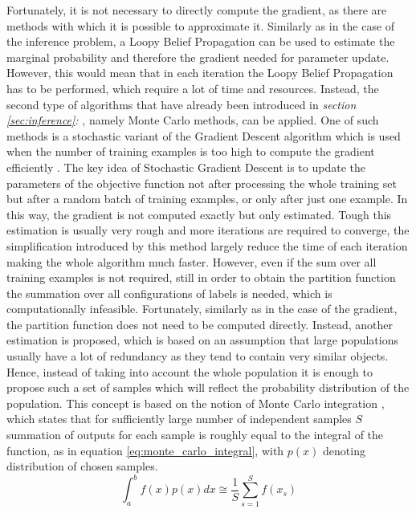Fortunately, it is not necessary to directly compute the gradient, as there are methods with which it is possible to approximate it. Similarly as in the case of the inference problem, a Loopy Belief Propagation can be used to estimate the marginal probability and therefore the gradient needed for parameter update. However, this would mean that in each iteration the Loopy Belief Propagation has to be performed, which require a lot of time and resources. Instead, the second type of algorithms that have already been introduced in \textit{section \ref{sec:inference}: }, namely Monte Carlo methods, can be applied. One of such methods is a stochastic variant of the Gradient Descent algorithm which is used when the number of training examples is too high to compute the gradient efficiently \cite{optimisation_curtis}. The key idea of Stochastic Gradient Descent is to update the parameters of the objective function not after processing the whole training set but after a random batch of training examples, or only after just one example. In this way, the gradient is not computed exactly but only estimated. Tough this estimation is usually very rough and more iterations are required to converge, the simplification introduced by this method largely reduce the time of each iteration making the whole algorithm much faster. However, even if the sum over all training examples is not required, still in order to obtain the partition function the summation over all configurations of labels is needed, which is computationally infeasible. Fortunately, similarly as in the case of the gradient, the partition function does not need to be computed directly. Instead, another estimation is proposed, which is based on an assumption that large populations usually have a lot of redundancy as they tend to contain very similar objects. Hence, instead of taking into account the whole population it is enough to propose such a set of samples which will reflect the probability distribution of the population. This concept is based on the notion of Monte Carlo integration \cite{bayesian_statistics}, which states that for sufficiently large number of independent samples $S$ summation of outputs for each sample is roughly equal to the integral of the function, as in equation \ref{eq:monte_carlo_integral}, with $p(x)$ denoting distribution of chosen samples.
\begin{equation}
    \label{eq:monte_carlo_integral}
    \int_{a}^{b}{f(x)p(x)dx} \cong \frac{1}{S}\sum_{s=1}^{S}{f(x_s)}
\end{equation}
